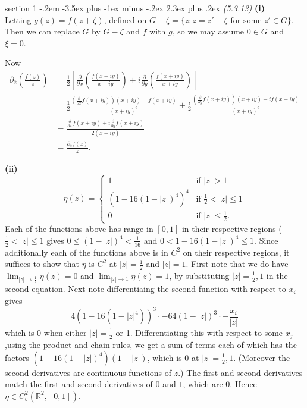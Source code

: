 \documentclass[12pt]{article}
\makeatletter
\theoremstyle{norm}
\newcommand{\R}[0]{\mathbb{R}}
\newcommand{\rc}[1]{\frac{1}{#1}}
\newcommand{\ba}[1]{\left[ {#1} \right]}
\newcommand{\pa}[1]{\left( {#1} \right)}
\newcommand{\subprob}[1]{\noindent\textbf{#1}\\}
\newcommand{\pf}[2]{\pa{\frac{#1}{#2}}}
\newcommand{\pd}[2]{\frac{\partial #1}{\partial #2}}
\newcommand{\ol}[1]{\overline{#1}}
\newenvironment{problem}{\@startsection
       {section}
       {1}
       {-.2em}
       {-3.5ex plus -1ex minus -.2ex}
       {2.3ex plus .2ex}
       {\pagebreak[3]%
       \large\bf\noindent{Problem }
       }
       }
       {%
       }
\makeatother
\begin{document}
\begin{problem}{\it(5.3.13)}
\subprob{(i)}
Letting $g(z)=f(z+\zeta)$, defined on $G-\zeta=\{z:z=z'-\zeta\text{ for some }z'\in G\}$. Then we can replace $G$ by $G-\zeta$ and $f$ with $g$, so we may assume $0\in G$ and $\xi=0$.

Now
\begin{align*}
\partial_{\ol z}\pf{f(z)}{z}&=
\rc{2}\ba{\pd{}x\pf{f(x+iy)}{x+iy}+i\pd{}y\pf{f(x+iy)}{x+iy}}\\
&=\rc{2}\frac{\pa{\pd{}xf(x+iy)}(x+iy)-f(x+iy)}{(x+iy)^2}
+\frac{i}{2}\frac{\pa{\pd{}yf(x+iy)}(x+iy)-if(x+iy)}{(x+iy)^2}\\
&=\frac{\pd{}xf(x+iy)+i\pd{}yf(x+iy)}{2(x+iy)}\\
&=\frac{\partial_{\ol{z}}f(z)}{z}.
\end{align*}

\subprob{(ii)}
\[
\eta(z)=
\begin{cases}
1&\text{if }|z|>1\\
(1-16(1-|z|)^4)^4&\text{if }\rc2<|z|\le 1\\
0&\text{if }|z|\le \rc 2.
\end{cases}
\]
Each of the functions above has range in $[0,1]$ in their respective regions ($\rc2<|z|\le 1$ gives $0\le(1-|z|)^4<\rc{16}$ and $0< 1-16(1-|z|)^4\le 1$. 
Since additionally each of the functions above is in $C^2$ on their respective regions, it suffices to show that $\eta$ is $C^2$ at $|z|=\rc 2$ and $|z|=1$. First note that we do have $\lim_{|z|\to \rc 2} \eta(z)=0$ and $\lim_{|z|\to 1}\eta(z)=1$, by substituting $|z|=\rc 2, 1$ in the second equation. Next note differentiaing the second function with respect to $x_i$ gives
\[
4(1-16(1-|z|^4))^3 \cdot -64(1-|z|)^3 \cdot -\frac{x_i}{|z|}
\]
which is 0 when either $|z|=\rc 2$ or 1. Differentiating this with respect to some $x_j$,using the product and chain rules, we get a sum of terms each of which has the factors $(1-16(1-|z|)^4)(1-|z|)$, which is 0 at $|z|=\rc 2, 1$. (Moreover the second derivatives are continuous functions of $z$.) The first and second derivatives match the first and second derivatives of $0$ and $1$, which are 0. Hence $\eta\in C^2_b(\R^2,[0,1])$.\\


\end{problem}
\end{document}
